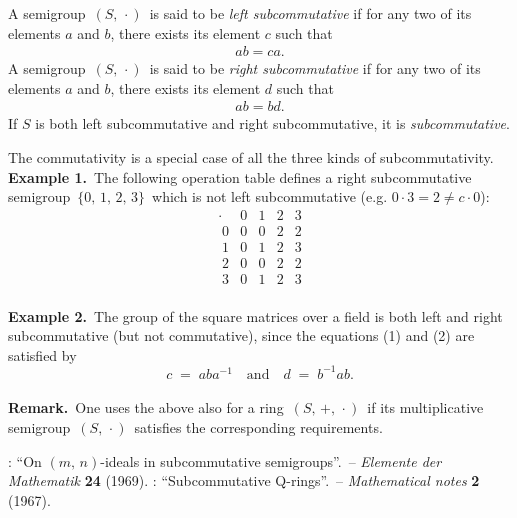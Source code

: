 \documentclass[12pt]{article}
\theoremstyle{definition}
\begin{document}
A semigroup \,$(S,\,\cdot)$\, is said to be \emph{left subcommutative} if for any two of its elements $a$ and $b$, there exists its element $c$ such that
\begin{align}
ab = ca.
\end{align}
A semigroup \,$(S,\,\cdot)$\, is said to be \emph{right subcommutative} if for any two of its elements $a$ and $b$, there exists its element $d$ such that
\begin{align}
ab = bd.
\end{align}
If $S$ is both left subcommutative and right subcommutative, it is \emph{subcommutative}.

The commutativity is a special case of all the three kinds of subcommutativity.\\

\textbf{Example 1.}\, The following operation table defines a right subcommutative semigroup\, $\{0,\,1,\,2,\,3\}$\, which is not left subcommutative (e.g. $0\!\cdot\!3 = 2 \neq c\!\cdot\!0$):
$$\begin{array}{c|cccc}
\cdot & 0 & 1 & 2 & 3 \\
\hline
\;  0 & 0 & 0 & 2 & 2 \\
\;  1 & 0 & 1 & 2 & 3 \\
\;  2 & 0 & 0 & 2 & 2 \\
\;  3 & 0 & 1 & 2 & 3
\end{array}$$\\

\textbf{Example 2.}\, The  group of the square matrices over a field is both left and right subcommutative (but not commutative), since the equations (1) and (2) are satisfied by 
$$c \;=\; aba^{-1} \quad \mbox{and} \quad d\;=\; b^{-1}ab.$$\\



\textbf{Remark.}\, One uses the above  also for a ring \,$(S,\,+,\,\cdot)$\, if its multiplicative semigroup \,$(S,\,\cdot)$\, satisfies the corresponding requirements.

\begin{thebibliography}{8}
: ``On $(m,\,n)$-ideals in subcommutative semigroups''.\, -- \emph{Elemente der Mathematik} \textbf{24} (1969).
: ``Subcommutative Q-rings''.\, -- \emph{Mathematical notes} \textbf{2} (1967).
\end{thebibliography}

\end{document}
